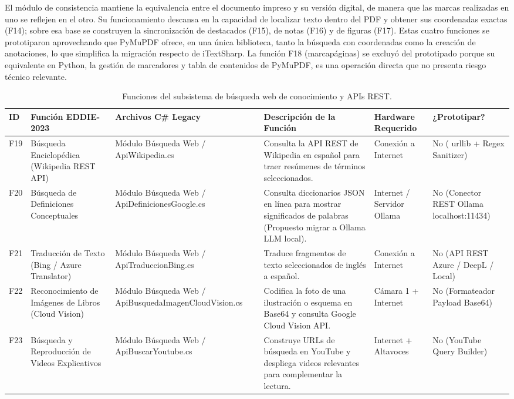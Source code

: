 El módulo de consistencia mantiene la equivalencia entre el documento impreso y su versión digital, de manera que las marcas realizadas en uno se reflejen en el otro. Su funcionamiento descansa en la capacidad de localizar texto dentro del PDF y obtener sus coordenadas exactas (F14); sobre esa base se construyen la sincronización de destacados (F15), de notas (F16) y de figuras (F17). Estas cuatro funciones se prototiparon aprovechando que PyMuPDF ofrece, en una única biblioteca, tanto la búsqueda con coordenadas como la creación de anotaciones, lo que simplifica la migración respecto de iTextSharp. La función F18 (marcapáginas) se excluyó del prototipado porque su equivalente en Python, la gestión de marcadores y tabla de contenidos de PyMuPDF, es una operación directa que no presenta riesgo técnico relevante.
 
\begin{table}[H]
    \centering
    \caption{Funciones del subsistema de búsqueda web de conocimiento y APIs REST.}
    \label{tab:func_busqueda_web}
    \begin{small}
    \begin{tabular}{|L{0.6cm}|L{2.2cm}|L{2.2cm}|L{4.1cm}|L{1.6cm}|L{1.8cm}|}
        \hline
        \textbf{ID} & \textbf{Función EDDIE-2023} & \textbf{Archivos C\# Legacy} & \textbf{Descripción de la Función} & \textbf{Hardware Requerido} & \textbf{¿Prototipar?} \\ \hline
        F19 & Búsqueda Enciclopédica (Wikipedia REST API) & Módulo Búsqueda Web / ApiWikipedia.cs & Consulta la API REST de Wikipedia en español para traer resúmenes de términos seleccionados. & Conexión a Internet & No ( urllib + Regex Sanitizer) \\ \hline
        F20 & Búsqueda de Definiciones Conceptuales & Módulo Búsqueda Web / ApiDefinicionesGoogle.cs & Consulta diccionarios JSON en línea para mostrar significados de palabras (Propuesto migrar a Ollama LLM local). & Internet / Servidor Ollama & No (Conector REST Ollama localhost:11434) \\ \hline
        F21 & Traducción de Texto (Bing / Azure Translator) & Módulo Búsqueda Web / ApiTraduccionBing.cs & Traduce fragmentos de texto seleccionados de inglés a español. & Conexión a Internet & No (API REST Azure / DeepL / Local) \\ \hline
        F22 & Reconocimiento de Imágenes de Libros (Cloud Vision) & Módulo Búsqueda Web / ApiBusquedaImagenCloudVision.cs & Codifica la foto de una ilustración o esquema en Base64 y consulta Google Cloud Vision API. & Cámara 1 + Internet & No (Formateador Payload Base64) \\ \hline
        F23 & Búsqueda y Reproducción de Videos Explicativos & Módulo Búsqueda Web / ApiBuscarYoutube.cs & Construye URLs de búsqueda en YouTube y despliega videos relevantes para complementar la lectura. & Internet + Altavoces & No (YouTube Query Builder) \\ \hline
    \end{tabular}
    \end{small}
\end{table}
 
